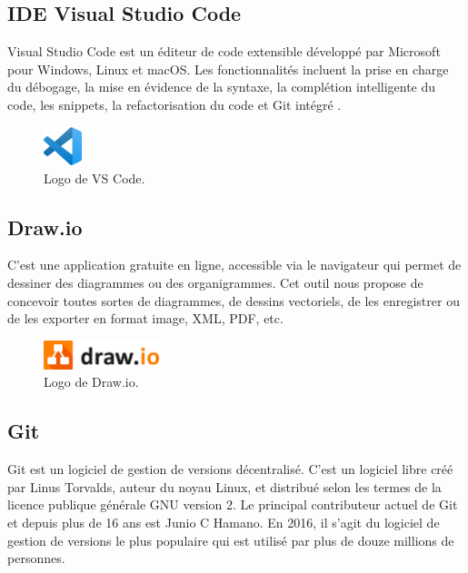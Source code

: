 \documentclass[french]{report}
\begin{document}
        \subsection{IDE Visual Studio Code}
        Visual Studio Code est un éditeur de code extensible développé par Microsoft pour Windows,
	Linux et macOS. Les fonctionnalités incluent la prise en charge du débogage,
	la mise en évidence de la syntaxe, la complétion intelligente du code, les snippets,
	la refactorisation du code et Git intégré \cite{ide}.
        
        \begin{figure}[H]
            \centering
            \includegraphics[width=0.1\textwidth]{images/1024px-Visual_Studio_Code_1.35_icon.svg.png}
            \caption{Logo de VS Code.}
            \label{fig:my_label}
        \end{figure}
        
         \subsection{Draw.io}
        C'est une application gratuite en ligne, accessible via le navigateur qui
	permet de dessiner des diagrammes ou des organigrammes. Cet outil nous
	propose de concevoir toutes sortes de diagrammes, de dessins vectoriels,
	de les enregistrer ou de les exporter en format image, XML, PDF, etc.

        \begin{figure}[H]
            \centering
            \includegraphics[width=0.3\textwidth]{images/drawio.jpg}
            \caption{Logo de Draw.io.}
            \label{fig:my_label}
        \end{figure}
        
         \subsection{Git}
        Git est un logiciel de gestion de versions décentralisé. C'est un logiciel
	libre créé par Linus Torvalds, auteur du noyau Linux, et distribué selon 
	les termes de la licence publique générale GNU version 2. Le principal 
	contributeur actuel de Git et depuis plus de 16 ans est Junio C Hamano.
	En 2016, il s'agit du logiciel de gestion de versions le plus populaire
	qui est utilisé par plus de douze millions de personnes.
\end{document}
